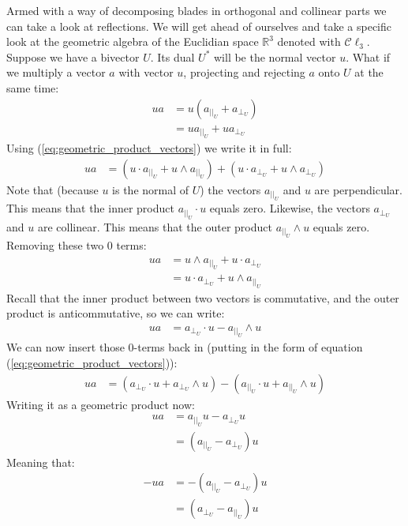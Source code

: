 \documentclass[10pt]{report}
\begin{document}
Armed with a way of decomposing blades in orthogonal and collinear
parts we can take a look at reflections. We will get ahead of
ourselves and take a specific look at the geometric algebra of the
Euclidian space $\mathbb{R}^3$ denoted with $\mathcal{C}\ell_3$.
Suppose we have a bivector $U$. Its dual $U^*$ will be the normal
vector $u$. What if we multiply a vector $a$ with vector $u$,
projecting and rejecting $a$ onto $U$ at the same time:
\begin{align*}
        ua &= u(a_{||_{U}} + a_{\bot_{U}}) \\
           &=  ua_{||_{U}} + ua_{\bot_{U}}
\end{align*}
Using (\ref{eq:geometric_product_vectors}) we write it in full:
\begin{align*}
        ua &= (u\cdot a_{||_{U}} + u\wedge a_{||_{U}}) +
              (u\cdot a_{\bot_{U}}+ u\wedge a_{\bot_{U}})
\end{align*}
Note that (because $u$ is the normal of $U$) the vectors
$a_{||_{U}}$ and $u$ are perpendicular. This means that the inner
product $a_{||_{U}}\cdot u$ equals zero. Likewise, the vectors
$a_{\bot_{U}}$ and $u$ are collinear. This means that the outer
product $a_{||_{U}}\wedge u$ equals zero. Removing these two $0$
terms:
\begin{align*}
        ua &= u\wedge a_{||_{U}} + u\cdot a_{\bot_{U}} \\
           &= u\cdot a_{\bot_{U}} + u\wedge a_{||_{U}}
\end{align*}
Recall that the inner product between two vectors is commutative,
and the outer product is anticommutative, so we can write:
\begin{align*}
        ua &= a_{\bot_{U}}\cdot u - a_{||_{U}} \wedge u
\end{align*}
We can now insert those $0$-terms back in (putting in the form of
equation (\ref{eq:geometric_product_vectors})):
\begin{align*}
        ua &= (a_{\bot_{U}}\cdot u + a_{\bot_{U}}\wedge u) -
              (a_{||_{U}}\cdot u   + a_{||_{U}}\wedge u)
\end{align*}
Writing it as a geometric product now:
\begin{align*}
        ua &= a_{||_{U}}u - a_{\bot_{U}}u   \\
           &= (a_{||_{U}} - a_{\bot_{U}})u
\end{align*}
Meaning that:
\begin{align*}
        -ua &= -(a_{||_{U}} - a_{\bot_{U}})u    \\
            &=  (a_{\bot_{U}} - a_{||_{U}})u
\end{align*}
\end{document}
